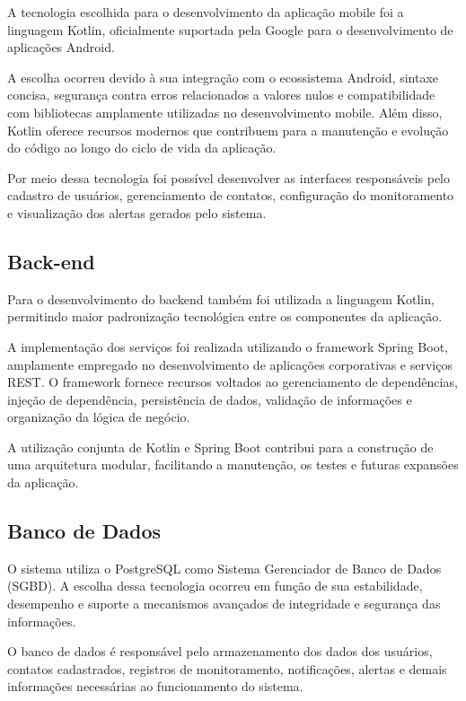 A tecnologia escolhida para o desenvolvimento da aplicação mobile foi a linguagem Kotlin, oficialmente suportada pela Google para o desenvolvimento de aplicações Android.

A escolha ocorreu devido à sua integração com o ecossistema Android, sintaxe concisa, segurança contra erros relacionados a valores nulos e compatibilidade com bibliotecas amplamente utilizadas no desenvolvimento mobile. Além disso, Kotlin oferece recursos modernos que contribuem para a manutenção e evolução do código ao longo do ciclo de vida da aplicação.

Por meio dessa tecnologia foi possível desenvolver as interfaces responsáveis pelo cadastro de usuários, gerenciamento de contatos, configuração do monitoramento e visualização dos alertas gerados pelo sistema.

\subsection{Back-end}

Para o desenvolvimento do backend também foi utilizada a linguagem Kotlin, permitindo maior padronização tecnológica entre os componentes da aplicação.

A implementação dos serviços foi realizada utilizando o framework Spring Boot, amplamente empregado no desenvolvimento de aplicações corporativas e serviços REST. O framework fornece recursos voltados ao gerenciamento de dependências, injeção de dependência, persistência de dados, validação de informações e organização da lógica de negócio.

A utilização conjunta de Kotlin e Spring Boot contribui para a construção de uma arquitetura modular, facilitando a manutenção, os testes e futuras expansões da aplicação.

\subsection{Banco de Dados}

O sistema utiliza o PostgreSQL como Sistema Gerenciador de Banco de Dados (SGBD). A escolha dessa tecnologia ocorreu em função de sua estabilidade, desempenho e suporte a mecanismos avançados de integridade e segurança das informações.

O banco de dados é responsável pelo armazenamento dos dados dos usuários, contatos cadastrados, registros de monitoramento, notificações, alertas e demais informações necessárias ao funcionamento do sistema.

